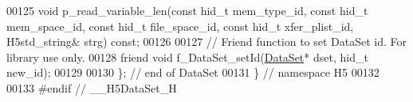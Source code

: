 \begin{DoxyCode}
00125         \textcolor{keywordtype}{void} p\_read\_variable\_len(\textcolor{keyword}{const} hid\_t mem\_type\_id, \textcolor{keyword}{const} hid\_t mem\_space\_id, \textcolor{keyword}{const} hid\_t 
      file\_space\_id, \textcolor{keyword}{const} hid\_t xfer\_plist\_id, H5std\_string& strg) \textcolor{keyword}{const};
00126 
00127         \textcolor{comment}{// Friend function to set DataSet id.  For library use only.}
00128         \textcolor{keyword}{friend} \textcolor{keywordtype}{void} f\_DataSet\_setId(\hyperlink{class_h5_1_1_data_set}{DataSet}* dset, hid\_t new\_id);
00129 
00130 \}; \textcolor{comment}{// end of DataSet}
00131 \} \textcolor{comment}{// namespace H5}
00132 
00133 \textcolor{preprocessor}{#endif // \_\_H5DataSet\_H}
\end{DoxyCode}
